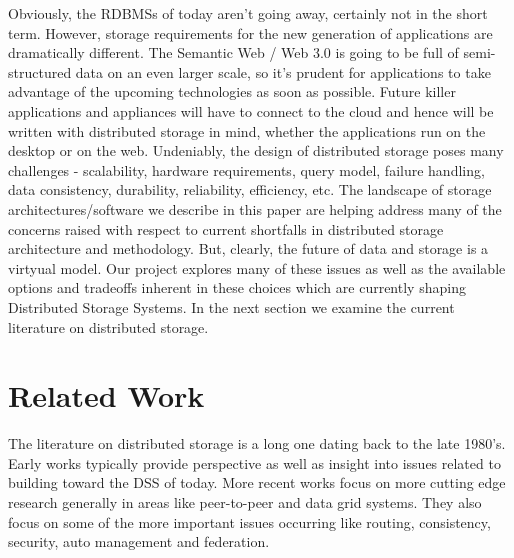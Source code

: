 \documentclass[11pt]{article}
\begin{document}
Obviously, the RDBMSs of today aren't going away, certainly not in the short 
term. However, storage requirements for the new generation of applications 
are dramatically different. The Semantic Web / Web 3.0 is going to be full 
of semi-structured data on an even larger scale, so it's prudent for 
applications to take advantage of the upcoming technologies as soon as 
possible. Future killer applications and appliances will have to connect to the 
cloud and hence will be written with distributed storage in mind, whether the 
applications run on the desktop or on the web. Undeniably, the design of 
distributed storage poses many challenges - scalability, hardware requirements, 
query model, failure handling, data consistency, durability, reliability, 
efficiency, etc. The landscape of storage architectures/software we describe 
in this paper are helping address many of the concerns raised with respect to 
current shortfalls in distributed storage architecture and methodology. But, 
clearly, the future of data and storage is a virtyual model. Our project 
explores many of these issues as well as the available options and tradeoffs 
inherent in these choices which are currently shaping Distributed Storage 
Systems. In the next section we examine the current literature on distributed 
storage.

\section{Related Work}
The literature on distributed storage is a long one dating back to the late 
1980’s. Early works typically provide perspective as well as insight into 
issues related to building toward the DSS of today. More recent works focus 
on more cutting edge research generally in areas like peer-to-peer and data 
grid systems. They also focus on some of the more important issues occurring 
like routing, consistency, security, auto management and federation.
\end{document}

